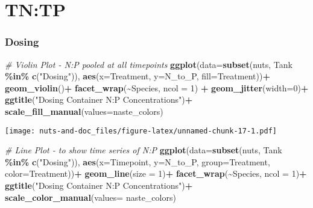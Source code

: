 \documentclass[
]{article}
\newenvironment{Shaded}{\begin{snugshade}}{\end{snugshade}}
\newcommand{\AttributeTok}[1]{\textcolor[rgb]{0.13,0.29,0.53}{#1}}
\newcommand{\CommentTok}[1]{\textcolor[rgb]{0.56,0.35,0.01}{\textit{#1}}}
\newcommand{\DecValTok}[1]{\textcolor[rgb]{0.00,0.00,0.81}{#1}}
\newcommand{\FunctionTok}[1]{\textcolor[rgb]{0.13,0.29,0.53}{\textbf{#1}}}
\newcommand{\NormalTok}[1]{#1}
\newcommand{\SpecialCharTok}[1]{\textcolor[rgb]{0.81,0.36,0.00}{\textbf{#1}}}
\newcommand{\StringTok}[1]{\textcolor[rgb]{0.31,0.60,0.02}{#1}}
\begin{document}
\hypertarget{tntp}{%
\section{TN:TP}\label{tntp}}

\hypertarget{dosing-6}{%
\subsubsection{Dosing}\label{dosing-6}}

\begin{Shaded}
\begin{Highlighting}[]
\CommentTok{\# Violin Plot {-} N:P pooled at all timepoints}
\FunctionTok{ggplot}\NormalTok{(}\AttributeTok{data=}\FunctionTok{subset}\NormalTok{(nuts, Tank }\SpecialCharTok{\%in\%} \FunctionTok{c}\NormalTok{(}\StringTok{"Dosing"}\NormalTok{)), }\FunctionTok{aes}\NormalTok{(}\AttributeTok{x=}\NormalTok{Treatment, }\AttributeTok{y=}\NormalTok{N\_to\_P, }\AttributeTok{fill=}\NormalTok{Treatment))}\SpecialCharTok{+}
  \FunctionTok{geom\_violin}\NormalTok{()}\SpecialCharTok{+}
  \FunctionTok{facet\_wrap}\NormalTok{(}\SpecialCharTok{\textasciitilde{}}\NormalTok{Species, }\AttributeTok{ncol =} \DecValTok{1}\NormalTok{) }\SpecialCharTok{+}
  \FunctionTok{geom\_jitter}\NormalTok{(}\AttributeTok{width=}\DecValTok{0}\NormalTok{)}\SpecialCharTok{+}
  \FunctionTok{ggtitle}\NormalTok{(}\StringTok{"Dosing Container N:P Concentrations"}\NormalTok{)}\SpecialCharTok{+}
  \FunctionTok{scale\_fill\_manual}\NormalTok{(}\AttributeTok{values=}\NormalTok{naste\_colors)}
\end{Highlighting}
\end{Shaded}

\texttt{[image: nuts-and-doc\_files/figure-latex/unnamed-chunk-17-1.pdf]}

\begin{Shaded}
\begin{Highlighting}[]
\CommentTok{\# Line Plot {-} to show time series of N:P}
\FunctionTok{ggplot}\NormalTok{(}\AttributeTok{data=}\FunctionTok{subset}\NormalTok{(nuts, Tank }\SpecialCharTok{\%in\%} \FunctionTok{c}\NormalTok{(}\StringTok{"Dosing"}\NormalTok{)), }\FunctionTok{aes}\NormalTok{(}\AttributeTok{x=}\NormalTok{Timepoint, }\AttributeTok{y=}\NormalTok{N\_to\_P, }\AttributeTok{group=}\NormalTok{Treatment, }\AttributeTok{color=}\NormalTok{Treatment))}\SpecialCharTok{+}
  \FunctionTok{geom\_line}\NormalTok{(}\AttributeTok{size =} \DecValTok{1}\NormalTok{)}\SpecialCharTok{+}
  \FunctionTok{facet\_wrap}\NormalTok{(}\SpecialCharTok{\textasciitilde{}}\NormalTok{Species, }\AttributeTok{ncol =} \DecValTok{1}\NormalTok{)}\SpecialCharTok{+}
  \FunctionTok{ggtitle}\NormalTok{(}\StringTok{"Dosing Container N:P Concentrations"}\NormalTok{)}\SpecialCharTok{+}
  \FunctionTok{scale\_color\_manual}\NormalTok{(}\AttributeTok{values=}\NormalTok{ naste\_colors)}
\end{Highlighting}
\end{Shaded}
\end{document}
